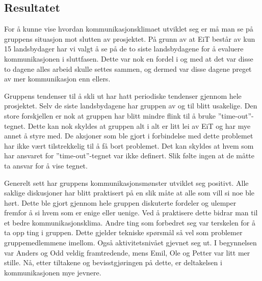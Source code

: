 \subsection{Resultatet}
For å kunne vise hvordan kommunikasjonsklimaet utviklet seg er må man se på gruppens situasjon mot slutten av prosjektet. 
På grunn av at EiT består av kun 15 landsbydager har vi valgt å se på de to siste landsbydagene for å evaluere kommunikasjonen i sluttfasen. 
Dette var nok en fordel i og med at det var disse to dagene alles arbeid skulle settes sammen, og dermed var disse dagene preget av mer kommunikasjon enn ellers.
\vspace{\secspace}

Gruppens tendenser til å skli ut har hatt periodiske tendenser gjennom hele prosjektet. 
Selv de siste landsbydagene har gruppen av og til blitt usakelige. 
Den store forskjellen er nok at gruppen har blitt mindre flink til å bruke ''time-out''-tegnet. 
Dette kan nok skyldes at gruppen alt i alt er litt lei av EiT og har mye annet å styre med. 
De aksjoner som ble gjort i forbindelse med dette problemet har ikke vært tilstrekkelig til å få bort problemet. 
Det kan skyldes at hvem som har ansvaret for ''time-out''-tegnet var ikke definert.
Slik følte ingen at de måtte ta ansvar for å vise tegnet. 
\vspace{\secspace}

Generelt sett har gruppens kommunikasjonsmønster utviklet seg positivt. 
Alle saklige diskusjoner har blitt praktisert på en slik måte at alle som vill si noe ble hørt. 
Dette ble gjort gjennom hele gruppen diskuterte fordeler og ulemper fremfor å si hvem som er enige eller uenige. 
Ved å praktisere dette bidrar man til et bedre kommunikasjonsklima\citep{levin}.
Andre ting som forbedret seg var terskelen for å ta opp ting i gruppen. 
Dette gjelder tekniske spørsmål så vel som problemer gruppemedlemmene imellom. 
Også aktivitetsnivået gjevnet seg ut. 
I begynnelsen var Anders og Odd veldig framtredende, mens Emil, Ole og Petter var litt mer stille. 
Nå, etter tiltakene og bevisstgjøringen på dette, er deltakelsen i kommunikasjonen mye jevnere.  
\vspace{\secspace}
